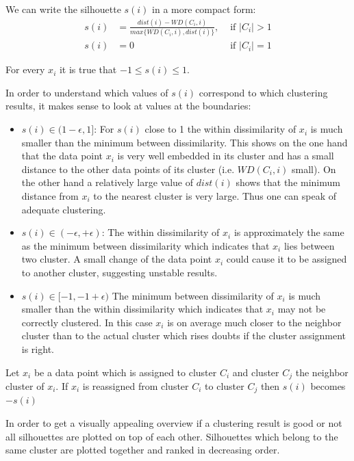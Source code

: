 \begin{remark}
	We can write the silhouette $s(i)$ in a more compact form: 
	\begin{align*}
		s(i) &= \frac{dist(i) - WD(C_i,i)}{max\{ WD(C_i,i), dist(i) \}},  &\text{ if } |C_i|>1 \\
		s(i) &= 0  &\text{ if } |C_i|=1
	\end{align*}
\end{remark}

\begin{remark}
	For every $x_i$ it is true that $-1 \leq s(i) \leq 1$.
\end{remark}

\begin{remark}
	In order to understand which values of $s(i)$ correspond to which clustering results, it makes sense to look at values at the boundaries: 
	\begin{itemize}[label=$\star$]
		\item $s(i) \in (1 - \epsilon, 1]$: For $s(i)$ close to 1 the within dissimilarity of $x_i$ is much smaller than the minimum between dissimilarity. This shows on the one hand that the data point $x_i$ is very well embedded in its cluster and has a small distance to the other data points of its cluster (i.e. $WD(C_i,i)$ small). On the other hand a relatively large value of $dist(i)$ shows that the minimum distance from $x_i$ to the nearest cluster is very large. Thus one can speak of adequate clustering.		
		\item $s(i) \in (-\epsilon, + \epsilon)$: The within dissimilarity of $x_i$ is approximately the same as the minimum between dissimilarity which indicates that $x_i$ lies between two cluster. A small change of the data point $x_i$ could cause it to be assigned to another cluster, suggesting unstable results.		
		\item $s(i) \in [-1, -1 + \epsilon)$ The minimum between dissimilarity of $x_i$ is much smaller than the within dissimilarity which indicates that $x_i$ may not be correctly clustered. In this case $x_i$ is on average much closer to the neighbor cluster than to the actual cluster which rises doubts if the cluster assignment is right. 
	\end{itemize}
\end{remark}

\begin{remark}	
	Let $x_i$ be a data point which is assigned to cluster $C_i$ and cluster $C_j$ the neighbor cluster of $x_i$. If $x_i$ is reassigned from cluster $C_i$ to cluster $C_j$ then $s (i)$ becomes $-s(i)$
\end{remark}
In order to get a visually appealing overview if a clustering result is good or not all silhouettes are plotted on top of each other. Silhouettes which belong to the same cluster are plotted together and ranked in decreasing order.

